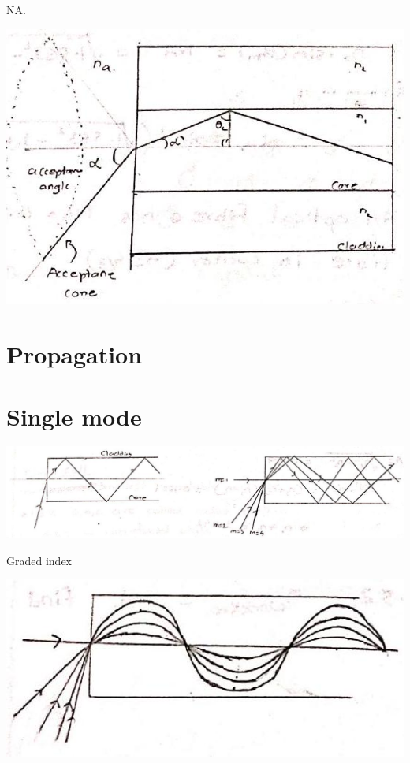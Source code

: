 \documentclass[10pt]{article}
\begin{document}
NA.

\begin{center}
\includegraphics[max width=\textwidth]{2024_06_16_30d750483617f1939202g-06(1)}
\end{center}

\section*{Propagation}
\section*{Single mode}
\begin{center}
\includegraphics[max width=\textwidth]{2024_06_16_30d750483617f1939202g-06(2)}
\end{center}

Graded index

\begin{center}
\includegraphics[max width=\textwidth]{2024_06_16_30d750483617f1939202g-06}
\end{center}
\end{document}
